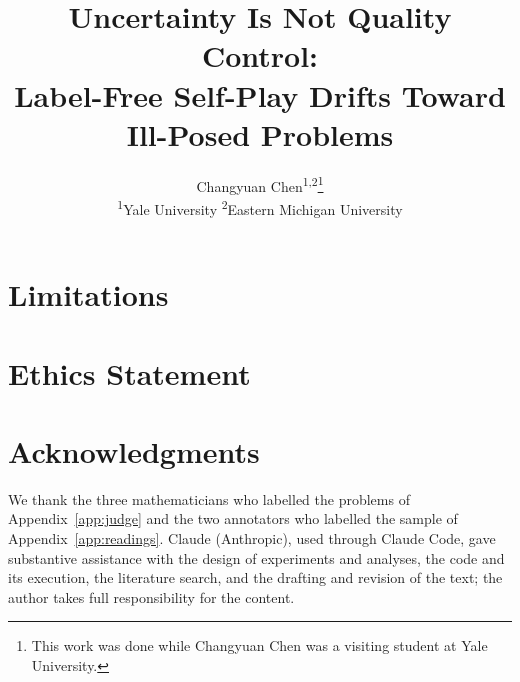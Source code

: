 \documentclass[11pt]{article}
\title{Uncertainty Is Not Quality Control:\\ Label-Free Self-Play Drifts Toward Ill-Posed Problems}
\author{Changyuan Chen\textsuperscript{1,2}\thanks{This work was done while Changyuan Chen was a visiting student at Yale University.} \\
  \textsuperscript{1}Yale University \quad \textsuperscript{2}Eastern Michigan University}
\begin{document}
\maketitle











\section*{Limitations}


\section*{Ethics Statement}


\section*{Acknowledgments}
We thank the three mathematicians who labelled the problems of Appendix~\ref{app:judge} and the two annotators who labelled the sample of Appendix~\ref{app:readings}. Claude (Anthropic), used through Claude Code, gave substantive assistance with the design of experiments and analyses, the code and its execution, the literature search, and the drafting and revision of the text; the author takes full responsibility for the content.



\appendix

\end{document}

